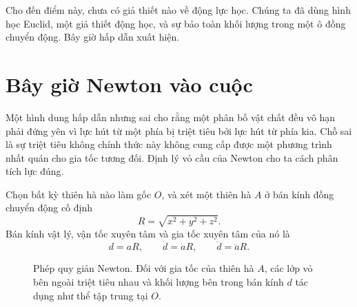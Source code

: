 Cho đến điểm này, chưa có giả thiết nào về động lực học. Chúng ta đã dùng hình học Euclid, một giả thiết động học, và sự bảo toàn khối lượng trong một ô đồng chuyển động. Bây giờ hấp dẫn xuất hiện.

\section{Bây giờ Newton vào cuộc}

Một hình dung hấp dẫn nhưng sai cho rằng một phân bố vật chất đều vô hạn phải đứng yên vì lực hút từ một phía bị triệt tiêu bởi lực hút từ phía kia. Chỗ sai là sự triệt tiêu không chính thức này không cung cấp được một phương trình nhất quán cho gia tốc tương đối. Định lý vỏ cầu của Newton cho ta cách phân tích lực đúng.

Chọn bất kỳ thiên hà nào làm gốc \(O\), và xét một thiên hà \(A\) ở bán kính đồng chuyển động cố định
\begin{equation}
R=\sqrt{x^2+y^2+z^2}.
\end{equation}
Bán kính vật lý, vận tốc xuyên tâm và gia tốc xuyên tâm của nó là
\begin{equation}
d=aR,
\qquad
\dot d=\dot a R,
\qquad
\ddot d=\ddot a R.
\label{eq:c01-radial-kinematics}
\end{equation}

\begin{figure}[ht]
\centering
{}
\caption{Phép quy giản Newton. Đối với gia tốc của thiên hà \(A\), các lớp vỏ bên ngoài triệt tiêu nhau và khối lượng bên trong bán kính \(d\) tác dụng như thể tập trung tại \(O\).}
\label{fig:c01-newton-sphere}
\end{figure}


